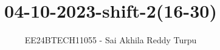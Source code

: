 \documentclass[journal]{IEEEtran}
\begin{document}

\vspace{3cm}

\title{04-10-2023-shift-2(16-30)}
\author{EE24BTECH11055 - Sai Akhila Reddy Turpu}
{\let\newpage\relax\maketitle}



\renewcommand{\thefigure}{\theenumi}
\renewcommand{\thetable}{\theenumi}
\setlength{\intextsep}{10pt} %


\renewcommand{\thetable}{\theenumi}
\end{document}
